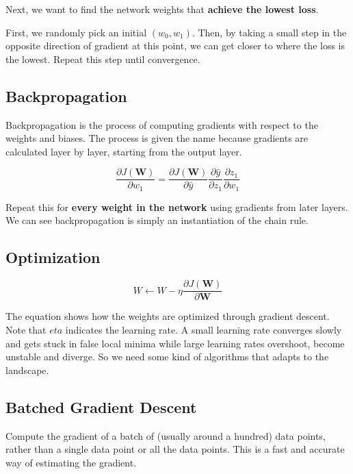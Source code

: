 \documentclass[12pt, a4paper, oneside]{article}
\begin{document}
Next, we want to find the network weights that \textbf{achieve the lowest loss}. 

First, we randomly pick an initial $(w_{0},w_{1})$. Then, by taking a small step in the opposite direction of gradient at this point, we can get closer to where the loss is the lowest. Repeat this step until convergence.

\subsection{Backpropagation}

Backpropagation is the process of computing gradients with respect to the weights and biases. The process is given the name because gradients are calculated layer by layer, starting from the output layer.

\begin{equation*}
    \frac{\partial J(\bm{W})}{\partial w_{1}}=\frac{\partial J(\bm{W})}{\partial \hat{y}}\frac{\partial\hat{y}}{\partial z_{1}}\frac{\partial z_{1}}{\partial w_{1}}
\end{equation*}

Repeat this for \textbf{every weight in the network} using gradients from later layers. We can see backpropagation is simply an instantiation of the chain rule.

\subsection{Optimization}

\begin{equation*}
    W\leftarrow W-\eta\frac{\partial J(\bm{W})}{\partial \bm{W}}
\end{equation*}

The equation shows how the weights are optimized through gradient descent. Note that $eta$ indicates the learning rate. A small learning rate converges slowly and gets stuck in false local minima while large learning rates overshoot, become unstable and diverge. So we need some kind of algorithms that adapts to the landscape.

\subsection{Batched Gradient Descent}

Compute the gradient of a batch of (usually around a hundred) data points, rather than a single data point or all the data points. This is a fast and accurate way of estimating the gradient.
\end{document}
